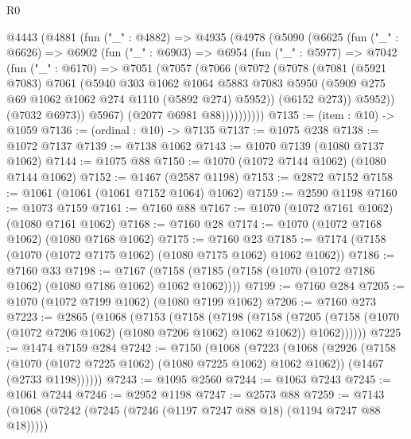 \begin{lexlean}{R0}
\begin{coremodule}
  @4443
    (@4881
      (fun ("_" : @4882) =>
      @4935
        (@4978
          (@5090
            (@6625
              (fun ("_" : @6626) =>
              @6902
                (fun ("_" : @6903) =>
                @6954
                  (fun ("_" : @5977) =>
                  @7042
                    (fun ("_" : @6170) =>
                    @7051
                      (@7057
                        (@7066
                          (@7072
                            (@7078
                              (@7081
                                (@5921 @7083)
                                @7061
                                (@5940
                                  @303
                                  @1062
                                  @1064
                                  @5883
                                  @7083
                                  @5950
                                  (@5909 @275 @69 @1062 @1062 @274 @1110 (@5892 @274) @5952))
                                (@6152 @273))
                              @5952))
                          (@7032 @6973))
                        @5967)
                      (@2077 @6981 @88))))))))))
@7135 := (item : @10) -> @1059
@7136 := (ordinal : @10) -> @7135
@7137 := @1075 @238
@7138 := @1072 @7137
@7139 := @7138 @1062
@7143 := @1070 @7139 (@1080 @7137 @1062)
@7144 := @1075 @88
@7150 := @1070 (@1072 @7144 @1062) (@1080 @7144 @1062)
@7152 := @1467 (@2587 @1198)
@7153 := @2872 @7152
@7158 := @1061 (@1061 (@1061 @7152 @1064) @1062)
@7159 := @2590 @1198
@7160 := @1073 @7159
@7161 := @7160 @88
@7167 := @1070 (@1072 @7161 @1062) (@1080 @7161 @1062)
@7168 := @7160 @28
@7174 := @1070 (@1072 @7168 @1062) (@1080 @7168 @1062)
@7175 := @7160 @23
@7185 := @7174 (@7158 (@1070 (@1072 @7175 @1062) (@1080 @7175 @1062) @1062 @1062))
@7186 := @7160 @33
@7198 := @7167 (@7158 (@7185 (@7158 (@1070 (@1072 @7186 @1062) (@1080 @7186 @1062) @1062 @1062))))
@7199 := @7160 @284
@7205 := @1070 (@1072 @7199 @1062) (@1080 @7199 @1062)
@7206 := @7160 @273
@7223 := @2865
    (@1068
      (@7153
        (@7158
          (@7198
            (@7158
              (@7205 (@7158 (@1070 (@1072 @7206 @1062) (@1080 @7206 @1062) @1062 @1062)) @1062))))))
@7225 := @1474 @7159 @284
@7242 := @7150
    (@1068
      (@7223
        (@1068
          (@2926
            (@7158 (@1070 (@1072 @7225 @1062) (@1080 @7225 @1062) @1062 @1062))
            (@1467 (@2733 @1198))))))
@7243 := @1095 @2560
@7244 := @1063 @7243
@7245 := @1061 @7244
@7246 := @2952 @1198
@7247 := @2573 @88
@7259 := @7143 (@1068 (@7242 (@7245 (@7246 (@1197 @7247 @88 @18) (@1194 @7247 @88 @18)))))

\end{coremodule}
\end{lexlean}
